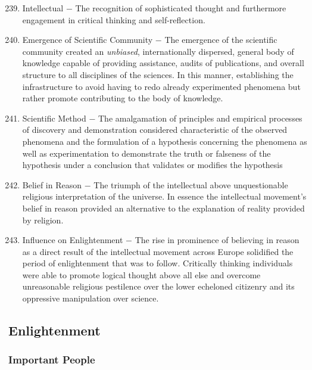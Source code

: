 \documentclass[12pt]{article}
\begin{document}
\begin{enumerate}
\begin{enumerate}[label=\arabic{*}.]
\setcounter{enumii}{238}

\item Intellectual $-$ The recognition of sophisticated thought and furthermore engagement in critical thinking and self-reflection.

\item Emergence of Scientific Community $-$ The emergence of the scientific community created an \textit{unbiased}, internationally dispersed, general body of knowledge capable of providing assistance, audits of publications, and overall structure to all disciplines of the sciences. In this manner, establishing the infrastructure to avoid having to redo already experimented phenomena but rather promote contributing to the body of knowledge.

\item Scientific Method $-$ The amalgamation of principles and empirical processes of discovery and demonstration considered characteristic of the observed phenomena and the formulation of a hypothesis concerning the phenomena as well as experimentation to demonstrate the truth or falseness of the hypothesis under a conclusion that validates or modifies the hypothesis

\item Belief in Reason $-$ The triumph of the intellectual above unquestionable religious interpretation of the universe. In essence the intellectual movement's belief in reason provided an alternative to the explanation of reality provided by religion.

\item Influence on Enlightenment $-$ The rise in prominence of believing in reason as a direct result of the intellectual movement across Europe solidified the period of enlightenment that was to follow. Critically thinking individuals were able to promote logical thought above all else and overcome unreasonable religious pestilence over the lower echeloned citizenry and its oppressive manipulation over science.

\end{enumerate}
\setcounter{enumi}{243}
\subsection{Enlightenment}

\subsubsection{Important People}


\end{enumerate}
\end{document}
